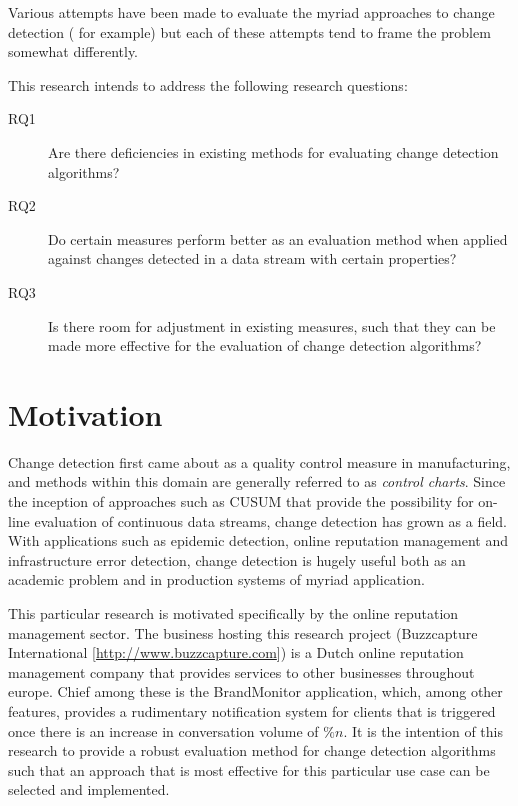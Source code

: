 \documentclass{uvamscse}	%
\begin{document}
Various attempts have been made to evaluate the myriad approaches to change detection (\cite{Buntain2014} for example) but each of these attempts tend to frame the problem somewhat differently.

This research intends to address the following research questions:


\begin{description}
	\item[RQ1] Are there deficiencies in existing methods for evaluating change detection algorithms?
	\item[RQ2] Do certain measures perform better as an evaluation method when applied against changes detected in a data stream with certain properties?
	\item[RQ3] Is there room for adjustment in existing measures, such that they can be made more effective for the evaluation of change detection algorithms?
\end{description}


\section{Motivation}

Change detection first came about as a quality control measure in manufacturing, and methods within this domain are generally referred to as \emph{control charts}. Since the inception of approaches such as CUSUM that provide the possibility for on-line evaluation of continuous data streams, change detection has grown as a field. With applications such as epidemic detection, online reputation management and infrastructure error detection, change detection is hugely useful both as an academic problem and in production systems of myriad application.

This particular research is motivated specifically by the online reputation management sector. The business hosting this research project (Buzzcapture International [\url{http://www.buzzcapture.com}]) is a Dutch online reputation management company that provides services to other businesses throughout europe. Chief among these is the BrandMonitor application, which, among other features, provides a rudimentary notification system for clients that is triggered once there is an increase in conversation volume of \(\%n\). It is the intention of this research to provide a robust evaluation method for change detection algorithms such that an approach that is most effective for this particular use case can be selected and implemented.
\end{document}
